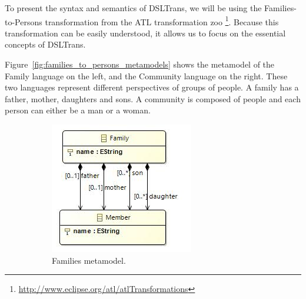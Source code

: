 To present the syntax and semantics of DSLTrans, we will be using the Families-to-Persons transformation from the ATL transformation zoo \footnote{\url{http://www.eclipse.org/atl/atlTransformations}}.
Because this transformation can be easily understood, it allows us to focus on the essential concepts of DSLTrans.

Figure~\ref{fig:families_to_persons_metamodels} shows the metamodel of the Family language on the left, and the Community language on the right.
These two languages represent different perspectives of groups of people. A family has a father, mother, daughters and sons.
A community is composed of people and each person can either be a man or a woman.

\begin{figure}
        \centering
        \begin{subfigure}{0.5\linewidth}
                \centering
                \includegraphics[width=\linewidth]{figures/Familiesclassdiagram}
                \caption{Families metamodel.}
                \label{fig:families_mm}
        \end{subfigure}%
        \begin{subfigure}{0.5\linewidth}
                \centering

\end{subfigure}
\end{figure}
